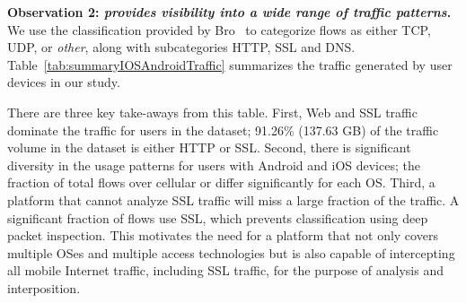 \noindent\textbf{Observation 2: \emph{\meddle provides visibility into a wide range of traffic patterns}.} 
We use the classification provided by Bro~\cite{bro} to categorize flows as either TCP, UDP, or \emph{other}, along with subcategories HTTP, SSL and DNS.
Table~\ref{tab:summaryIOSAndroidTraffic} summarizes the traffic generated by user devices in our study. 

There are three key take-aways from this table. 
First, Web and SSL traffic dominate the traffic for users in the \mobWild dataset; 91.26\% (137.63 GB) of the traffic volume in the \mobWild dataset is either HTTP or SSL.
Second, there is significant diversity in the usage patterns for users with Android and iOS devices; the fraction of total flows over cellular or \wifi differ significantly for each OS. 
Third, a platform that cannot analyze SSL traffic will miss a large fraction of the traffic.
A significant fraction of flows use SSL, which prevents classification using deep packet inspection.
This motivates the need for a platform that not only covers multiple OSes and multiple access technologies but is also capable of intercepting all mobile Internet traffic, including SSL traffic, for the purpose of analysis and interposition. 


